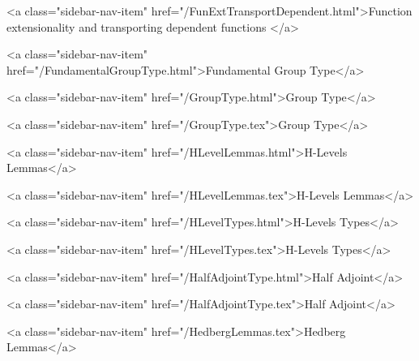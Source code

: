      
    
      
        
          <a class="sidebar-nav-item" href="/FunExtTransportDependent.html">Function extensionality and transporting dependent functions </a>
        
      
    
      
        
          <a class="sidebar-nav-item" href="/FundamentalGroupType.html">Fundamental Group Type</a>
        
      
    
      
        
          <a class="sidebar-nav-item" href="/GroupType.html">Group Type</a>
        
      
    
      
        
          <a class="sidebar-nav-item" href="/GroupType.tex">Group Type</a>
        
      
    
      
        
          <a class="sidebar-nav-item" href="/HLevelLemmas.html">H-Levels Lemmas</a>
        
      
    
      
        
          <a class="sidebar-nav-item" href="/HLevelLemmas.tex">H-Levels Lemmas</a>
        
      
    
      
        
          <a class="sidebar-nav-item" href="/HLevelTypes.html">H-Levels Types</a>
        
      
    
      
        
          <a class="sidebar-nav-item" href="/HLevelTypes.tex">H-Levels Types</a>
        
      
    
      
        
          <a class="sidebar-nav-item" href="/HalfAdjointType.html">Half Adjoint</a>
        
      
    
      
        
          <a class="sidebar-nav-item" href="/HalfAdjointType.tex">Half Adjoint</a>
        
      
    
      
        
          <a class="sidebar-nav-item" href="/HedbergLemmas.tex">Hedberg Lemmas</a>
        
